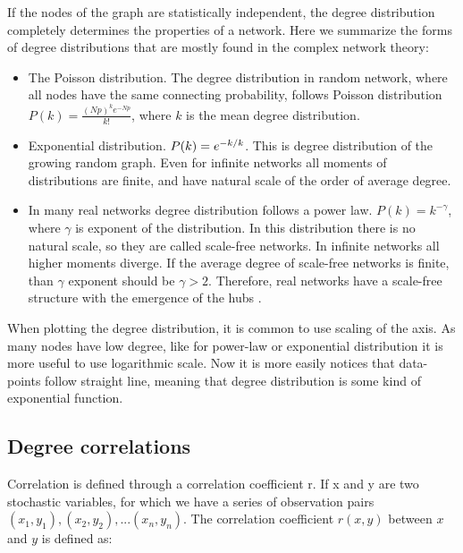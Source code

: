 If the nodes of the graph are statistically independent, the degree distribution completely determines the properties of a network. Here we summarize the forms of degree distributions that are mostly found in the complex network theory:
\begin{itemize}
	\item The Poisson distribution. The degree distribution in random network, where all nodes have the same connecting probability, follows Poisson distribution $P(k)= \frac{(Np)^ke^{-Np}}{k!}$, where $k$ is the mean degree distribution. 
	
	\item Exponential distribution. $P(k) = e^{-k/ \- k}$. This is degree distribution of the growing random graph. Even for infinite networks all moments of distributions are finite, and have natural scale of the order of average degree.
	
	\item In many real networks degree distribution follows a power law. $P(k) = k ^ {-\gamma} $, where $\gamma$ is exponent of the distribution. In this distribution there is no natural scale, so they are called scale-free networks. In infinite networks all higher moments diverge. If the average degree of scale-free networks is finite, than $\gamma$ exponent should be $\gamma>2$. Therefore, real networks have a scale-free structure with the emergence of the hubs \cite{newman2010}. 
\end{itemize}

When plotting the degree distribution, it is common to use scaling of the axis. As many nodes have  low degree, like for power-law or exponential distribution it is more useful to use logarithmic scale. Now it is more easily notices that data-points follow straight line, meaning that degree distribution is some kind of exponential function. 


\subsection{Degree correlations}

Correlation is defined through a correlation coefficient r. If x and y are two stochastic variables, for which we have a series of observation pairs $(x_1, y_1), (x_2, y_2), ... (x_n, y_n)$. The correlation coefficient $r(x, y)$ between $x$ and $y$ is defined as:

